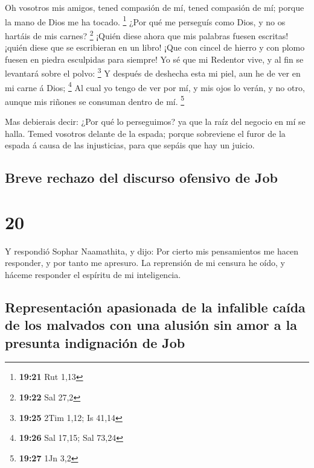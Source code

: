  Oh vosotros mis amigos, tened compasión de mí, tened
compasión de mí; porque la mano de Dios me ha tocado. \footnote{\textbf{19:21}
  Rut 1,13}  ¿Por qué me perseguís como Dios, y no os
hartáis de mis carnes? \footnote{\textbf{19:22} Sal 27,2} 
¡Quién diese ahora que mis palabras fuesen escritas! ¡quién diese que se
escribieran en un libro!  ¡Que con cincel de hierro y con
plomo fuesen en piedra esculpidas para siempre!  Yo sé que
mi Redentor vive, y al fin se levantará sobre el polvo: \footnote{\textbf{19:25}
  2Tim 1,12; Is 41,14}  Y después de deshecha esta mi piel,
aun he de ver en mi carne á Dios; \footnote{\textbf{19:26} Sal 17,15;
  Sal 73,24}  Al cual yo tengo de ver por mí, y mis ojos lo
verán, y no otro, aunque mis riñones se consuman dentro de mí.
\footnote{\textbf{19:27} 1Jn 3,2}

 Mas debierais decir: ¿Por qué lo perseguimos? ya que la
raíz del negocio en mí se halla.  Temed vosotros delante de
la espada; porque sobreviene el furor de la espada á causa de las
injusticias, para que sepáis que hay un juicio.

\hypertarget{breve-rechazo-del-discurso-ofensivo-de-job}{%
\subsection{Breve rechazo del discurso ofensivo de
Job}\label{breve-rechazo-del-discurso-ofensivo-de-job}}

\hypertarget{section-19}{%
\section{20}\label{section-19}}

 Y respondió Sophar Naamathita, y dijo:  Por
cierto mis pensamientos me hacen responder, y por tanto me apresuro.
 La reprensión de mi censura he oído, y háceme responder el
espíritu de mi inteligencia.

\hypertarget{representaciuxf3n-apasionada-de-la-infalible-cauxedda-de-los-malvados-con-una-alusiuxf3n-sin-amor-a-la-presunta-indignaciuxf3n-de-job}{%
\subsection{Representación apasionada de la infalible caída de los
malvados con una alusión sin amor a la presunta indignación de
Job}\label{representaciuxf3n-apasionada-de-la-infalible-cauxedda-de-los-malvados-con-una-alusiuxf3n-sin-amor-a-la-presunta-indignaciuxf3n-de-job}}


